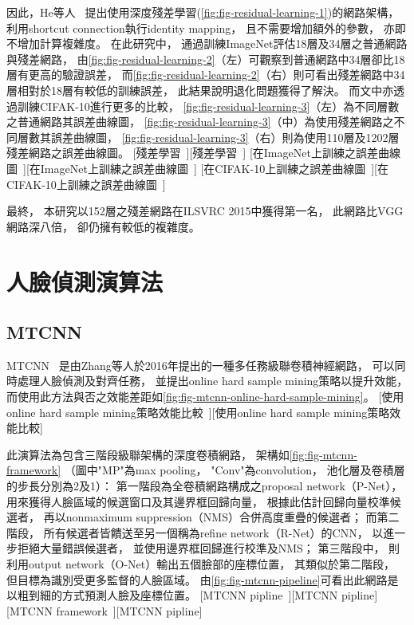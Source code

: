 \documentclass[class=NCU_thesis, crop=false]{standalone}
\begin{document}
因此，He等人~\cite{he_deep_2016}
提出使用深度殘差學習(\cref{fig:fig-residual-learning-1})的網路架構，
利用shortcut connection執行identity mapping，
且不需要增加額外的參數，
亦即不增加計算複雜度。
在此研究中，
通過訓練ImageNet評估18層及34層之普通網路與殘差網路，
由\cref{fig:fig-residual-learning-2}（左）可觀察到普通網路中34層卻比18層有更高的驗證誤差，
而\cref{fig:fig-residual-learning-2}（右）則可看出殘差網路中34層相對於18層有較低的訓練誤差，
此結果說明退化問題獲得了解決。
而文中亦透過訓練CIFAK-10進行更多的比較，
\cref{fig:fig-residual-learning-3}（左）為不同層數之普通網路其誤差曲線圖，
\cref{fig:fig-residual-learning-3}（中）為使用殘差網路之不同層數其誤差曲線圖，
\cref{fig:fig-residual-learning-3}（右）則為使用110層及1202層殘差網路之誤差曲線圖。
[殘差學習~\cite{he_deep_2016}][殘差學習~\cite{he_deep_2016}]
[在ImageNet上訓練之誤差曲線圖~\cite{he_deep_2016}][在ImageNet上訓練之誤差曲線圖~\cite{he_deep_2016}]
[在CIFAK-10上訓練之誤差曲線圖~\cite{he_deep_2016}][在CIFAK-10上訓練之誤差曲線圖~\cite{he_deep_2016}]

最終，
本研究以152層之殘差網路在ILSVRC 2015中獲得第一名，
此網路比VGG網路深八倍，
卻仍擁有較低的複雜度。

\section{人臉偵測演算法}
\subsection{MTCNN}
MTCNN~\cite{zhang_joint_2016}
是由Zhang等人於2016年提出的一種多任務級聯卷積神經網路，
可以同時處理人臉偵測及對齊任務，
並提出online hard sample mining策略以提升效能，
而使用此方法與否之效能差距如\cref{fig:fig-mtcnn-online-hard-sample-mining}。
[使用online hard sample mining策略效能比較~\cite{zhang_joint_2016}][使用online hard sample mining策略效能比較]

此演算法為包含三階段級聯架構的深度卷積網路，
架構如\cref{fig:fig-mtcnn-framework}
（圖中"MP"為max pooling，
"Conv"為convolution，
池化層及卷積層的步長分別為2及1）：
第一階段為全卷積網路構成之proposal network（P-Net），
用來獲得人臉區域的候選窗口及其邊界框回歸向量，
根據此估計回歸向量校準候選者，
再以nonmaximum suppression（NMS）合併高度重疊的候選者；
而第二階段，
所有候選者皆饋送至另一個稱為refine network（R-Net）的CNN，
以進一步拒絕大量錯誤候選者，
並使用邊界框回歸進行校準及NMS；
第三階段中，
則利用output network（O-Net）輸出五個臉部的座標位置，
其類似於第二階段，
但目標為識別受更多監督的人臉區域。
由\cref{fig:fig-mtcnn-pipeline}可看出此網路是以粗到細的方式預測人臉及座標位置。
[MTCNN pipline~\cite{zhang_joint_2016}][MTCNN pipline]
[MTCNN framework~\cite{zhang_joint_2016}][MTCNN pipline]
\end{document}
